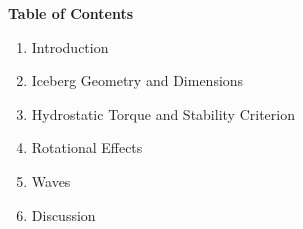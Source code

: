 \documentclass[draft]{agujournal2019}
\begin{document}

\noindent\textbf{Table of Contents}

\begin{enumerate}
    \item Introduction 
    \item Iceberg Geometry and Dimensions 
    \item Hydrostatic Torque and Stability Criterion 
    \item Rotational Effects 
    \item Waves 
    \item Discussion 
\end{enumerate}


%
%

%
%



\end{document}
